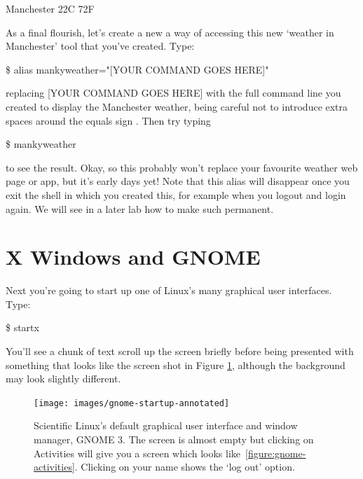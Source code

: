 \begin{ttoutenv}
   [33]Manchester 22\textdegree{}C 72\textdegree{}F
\end{ttoutenv}

As a final flourish, let's create a new a way of accessing this new `weather in Manchester' tool that you've created. Type:

\begin{ttoutenv}
\$ alias mankyweather="[YOUR COMMAND GOES HERE]"
\end{ttoutenv}

replacing [YOUR COMMAND GOES HERE] with the full command line you created to display the Manchester weather, being careful not to introduce extra spaces around the equals sign \ttout{=}. Then try typing

\begin{ttoutenv}
\$ mankyweather
\end{ttoutenv}


to see the result. Okay, so this probably won't replace your favourite weather web page or app, but it's early days yet!
Note that this alias will disappear once you exit the shell in which you created this, for example when you logout and login again. We will see in a later lab how to make such  permanent.


\section{X Windows and GNOME}

Next you're going to start up one of Linux's many graphical user interfaces. Type:

\begin{ttoutenv}
\$ startx
\end{ttoutenv}


You'll see a chunk of text scroll up the screen briefly before being presented with something that looks like the screen shot in Figure \ref{figure:gnome-desktop}, although the background may look slightly different.

\begin{figure}[t]
\centerline{\texttt{[image: images/gnome-startup-annotated]}}
\caption{Scientific Linux's default graphical user interface and
window manager, GNOME 3.
The screen is almost empty but clicking on \protect{} Activities will give you a screen which looks like~\ref{figure:gnome-activities}. Clicking on your name \protect{} shows the `log out'  option.}%
\label{figure:gnome-desktop}
\end{figure}


